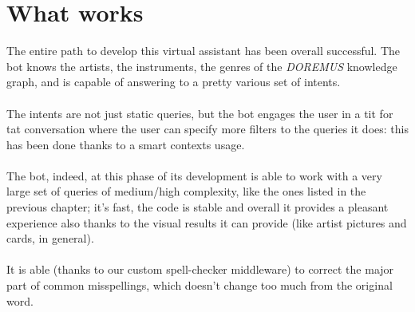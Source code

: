 \documentclass[a4paper,12pt]{report}
\begin{document}
	\section{What works}
	The entire path to develop this virtual assistant has been overall successful. The bot knows the artists, the instruments, the genres of the \textit{DOREMUS} knowledge graph, and is capable of answering to a pretty various set of intents.\\\\
	The intents are not just static queries, but the bot engages the user in a tit for tat conversation where the user can specify more filters to the queries it does: this has been done thanks to a smart contexts usage.\\\\
	The bot, indeed, at this phase of its development is able to work with a very large set of queries of medium/high complexity, like the ones listed in the previous chapter; it's fast, the code is stable and overall it provides a pleasant experience also thanks to the visual results it can provide (like artist pictures and cards, in general).\\\\
	It is able (thanks to our custom spell-checker middleware) to correct the major part of common misspellings, which doesn't change too much from the original word.
	
\end{document}
